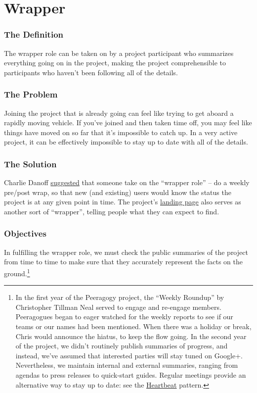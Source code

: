\section{Wrapper}\label{sec:Wrapper}
\subsubsection*{The Definition} The wrapper role can be taken on by a project
participant who summarizes everything going on in the project, making
the project comprehensible to participants who haven't been following
all of the details.

\subsubsection*{The Problem} Joining the project that is already going can feel
like trying to get aboard a rapidly moving vehicle. If you've joined and
then taken time off, you may feel like things have moved on so far that
it's impossible to catch up. In a very active project, it can be
effectively impossible to stay up to date with all of the details.

\subsubsection*{The Solution} Charlie
Danoff \href{http://socialmediaclassroom.com/host/peeragogy/wiki/rolesdivision-labor}{suggested}
that someone take on the ``wrapper role'' -- do a weekly pre/post wrap,
so that new (and existing) users would know the status the project is at
any given point in time. The
project's \href{http://socialmediaclassroom.com/host/peeragogy/}{landing
page} also serves as another sort of ``wrapper'', telling people what
they can expect to find.

\subsubsection*{Objectives} In fulfilling the wrapper role, we must check the
public summaries of the project from time to time to make sure that they
accurately represent the facts on the ground.\footnote{In the first year of the Peeragogy project, the
``Weekly Roundup'' by Christopher Tillman Neal served to engage and
re-engage members. Peeragogues began to eager watched for the weekly
reports to see if our teams or our names had been mentioned. When there
was a holiday or break, Chris would announce the hiatus, to keep the
flow going. In the second year of the project, we didn't routinely
publish summaries of progress, and instead, we've assumed that
interested parties will stay tuned on Google+. Nevertheless, we maintain
internal and external summaries, ranging from agendas to press releases
to quick-start guides. Regular meetings provide an alternative way to
stay up to date: see
the \href{http://peeragogy.org/patterns/heartbeat/}{Heartbeat} pattern.}

